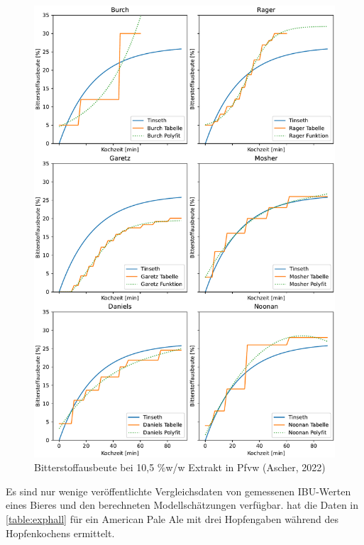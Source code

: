 \documentclass[a4paper,parskip=half]{scrartcl}
\begin{document}
\begin{figure}[h]
\centering
\includegraphics[width=14cm]{graph_utilization.pdf}
\caption{Bitterstoffausbeute bei 10,5 \%w/w Extrakt in Pfvw (Ascher, 2022)}
\label{fig:utilcompare}
\end{figure}

Es sind nur wenige veröffentlichte Vergleichsdaten von gemessenen IBU-Werten eines Bieres und den berechneten Modellschätzungen verfügbar. \textcite{Hall1997} hat die Daten in \autoref{table:exphall} für ein American Pale Ale mit drei Hopfengaben während des Hopfenkochens ermittelt.
\end{document}
